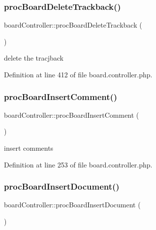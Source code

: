 \subsubsection{\texorpdfstring{proc\+Board\+Delete\+Trackback()}{procBoardDeleteTrackback()}}
{\footnotesize\ttfamily board\+Controller\+::proc\+Board\+Delete\+Trackback (\begin{DoxyParamCaption}{ }\end{DoxyParamCaption})}



delete the tracjback 



Definition at line 412 of file board.\+controller.\+php.

\mbox{\label{classboardController_ab643a9d4d386833e92bc2d7114319fb2}} 
\subsubsection{\texorpdfstring{proc\+Board\+Insert\+Comment()}{procBoardInsertComment()}}
{\footnotesize\ttfamily board\+Controller\+::proc\+Board\+Insert\+Comment (\begin{DoxyParamCaption}{ }\end{DoxyParamCaption})}



insert comments 



Definition at line 253 of file board.\+controller.\+php.

\mbox{\label{classboardController_a14ee978c5be08ee33f4c00a6960c4e60}} 
\subsubsection{\texorpdfstring{proc\+Board\+Insert\+Document()}{procBoardInsertDocument()}}
{\footnotesize\ttfamily board\+Controller\+::proc\+Board\+Insert\+Document (\begin{DoxyParamCaption}{ }\end{DoxyParamCaption})}



